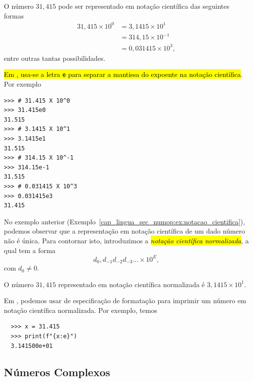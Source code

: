 \begin{ex}\label{cap_lingua_sec_numop:ex:notacao_cientifica}
  O número $31,415$ pode ser representado em notação científica das seguintes formas
  \begin{align}
    31,415\times 10^0 &= 3,1415\times 10^{1} \\
                      &= 314,15\times 10^{-1} \\
                      &= 0,031415\times 10^{3},
  \end{align}
  entre outras tantas possibilidades.

  \hl{Em {\python}, usa-se a letra \texttt{e} para separar a mantissa do expoente na notação científica}. Por exemplo

\begin{lstlisting}
>>> # 31.415 X 10^0
>>> 31.415e0
31.515
>>> # 3.1415 X 10^1
>>> 3.1415e1
31.515
>>> # 314.15 X 10^-1
>>> 314.15e-1
31.515
>>> # 0.031415 X 10^3
>>> 0.031415e3
31.415
\end{lstlisting}

\end{ex}

No exemplo anterior (Exemplo~\ref{cap_lingua_sec_numop:ex:notacao_cientifica}), podemos observar que a representação em notação científica de um dado número não é única. Para contornar isto, introduzimos a \hl{\emph{notação científica normalizada}}, a qual tem a forma
\begin{equation}
  d_0,d_{-1}d_{-2}d_{-3}\ldots\times 10^{E},
\end{equation}
com $d_0 \neq 0$.

\begin{ex}
  O número $31,415$ representado em notação científica normalizada é $3,1415\times 10^{1}$.

  Em {\python}, podemos usar de especificação de formatação para imprimir um número em notação científica normalizada. Por exemplo, temos

  \begin{lstlisting}
  >>> x = 31.415
  >>> print(f"{x:e}")
  3.141500e+01
  \end{lstlisting}

\end{ex}

\subsection{Números Complexos}


